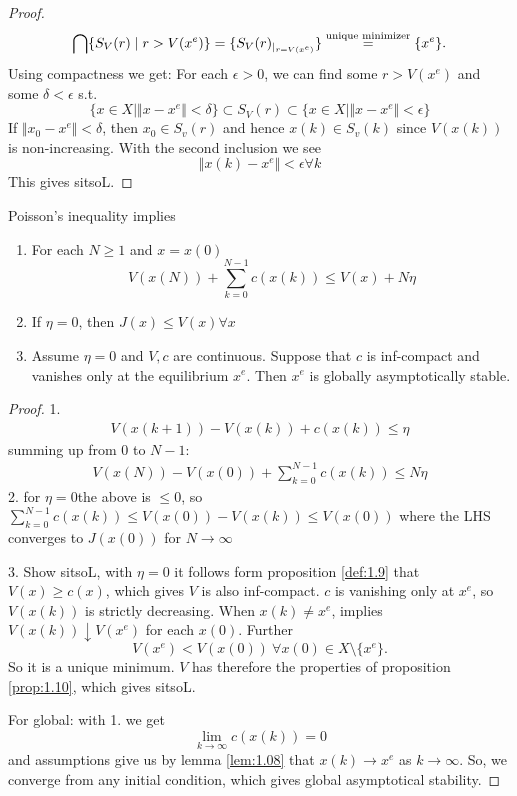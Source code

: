 \begin{proof}
    \[\bigcap \{S_V(r)\mid r>V(x^e)\}=\{S_V(r)_{|_{r=V(x^e)}}\}\stackrel{\text{unique minimizer}}{=}\{x^e\}.\]
    Using compactness we get: For each \(\epsilon>0\), we can find some \(r>V(x^e)\)
    and some \(\delta<\epsilon\) s.t. 
    \[\{x\in X\mid \Vert x-x^e\Vert < \delta\}\subset S_V(r)\subset \{x\in X\mid \Vert x-x^e\Vert < \epsilon\}\]
    If \(\Vert x_0-x^e\Vert<\delta\), then \(x_0\in S_v(r)\) and hence \(x(k)\in S_v(k)\)
    since \(V(x(k))\) is non-increasing. With the second inclusion we see 
    \[\Vert x(k)-x^e\Vert<\epsilon\forall k\]
    This gives sitsoL.
\end{proof}

\begin{proposition}\label{prop:1.11}
    Poisson's inequality implies 
    \begin{enumerate}
        \item For each \(N\geq 1\) and \(x=x(0)\) \[V(x(N))+\sum_{k=0}^{N-1}c(x(k))\leq V(x)+ N\eta\]
        \item If \(\eta=0\), then \(J(x)\leq V(x)\forall x\)
        \item Assume \(\eta=0\) and \(V,c\) are continuous. Suppose that \(c\) is inf-compact and vanishes only at the equilibrium \(x^e\). Then 
              \(x^e\) is globally asymptotically stable.  
    \end{enumerate}
\end{proposition}

\begin{proof}
    1. \begin{align*}
        V(x(k+1))-V(x(k))+c(x(k))\leq \eta 
    \end{align*}
    summing up from \(0\) to \(N-1\):
    \begin{align*}
        V(x(N))-V(x(0))+\sum_{k=0}^{N-1}c(x(k))\leq N\eta
    \end{align*}
    2. for \(\eta=0\)the above is \(\leq 0\), so \(\sum_{k=0}^{N-1}c(x(k))\leq V(x(0))-V(x(k))\leq V(x(0))\)
    where the LHS converges to \(J(x(0))\) for \(N\to\infty\) 

    3. Show sitsoL,  with \(\eta=0\) it follows form proposition \ref{def:1.9} that \(V(x)\geq c(x)\), which gives \(V\) is 
    also inf-compact. 
    \(c\) is vanishing only at \(x^e\), so \(V(x(k))\) is strictly decreasing. When \(x(k)\neq x^e\),
    implies \(V(x(k))\downarrow V(x^e)\) for each \(x(0)\). Further
    \[V(x^e)<V(x(0))\ \forall x(0)\in X\setminus\{x^e\}.\] 
    So it is a unique minimum. \(V\) has therefore the properties of proposition \ref{prop:1.10}, which gives sitsoL. 

    For global: with 1. we get \[\lim_{k\to\infty}c(x(k))=0\]
    and assumptions give us by lemma \ref{lem:1.08} that \(x(k)\to x^e\) as \(k\to\infty\).
    So, we converge from any initial condition, which gives global asymptotical stability.

\end{proof}


